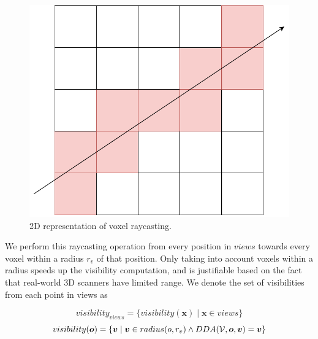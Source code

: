 \begin{figure}[h]
    \centering
    \includegraphics*[width=.5\textwidth]{./fig/voxel_raycast.pdf}
    \caption{2D representation of voxel raycasting.}
    \label{fig:voxel_raycast}

\end{figure}

We perform this raycasting operation from every position in \(views\) towards every voxel within a radius \(r_{v}\) of that position. Only taking into account voxels within a radius speeds up the visibility computation, and is justifiable based on the fact that real-world 3D scanners have limited range. We denote the set of visibilities from each point in views as 

\begin{equation}
    \label{eq:visibility_views}
visibility_{views} = \{visibility(\boldsymbol{x}) \mid \boldsymbol{x} \in views\}
\end{equation}
\begin{equation}
    visibility(\boldsymbol{o}) = \{\boldsymbol{v} \mid \boldsymbol{v} \in radius(o, r_{v}) \land DDA(\mathcal{V},\boldsymbol{o},\boldsymbol{v}) = \boldsymbol{v}\}
\end{equation}


